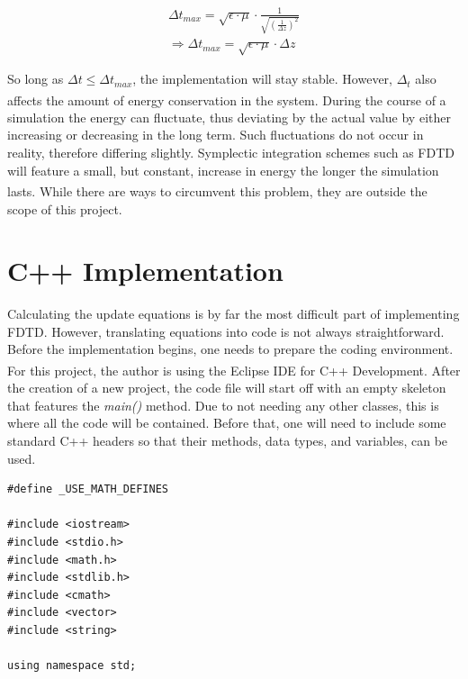 \begin{align}
	\label{eqn:1DdeltaTMaxFinal}
	\Delta t_{max} = \sqrt{\epsilon \cdot \mu} \cdot \frac{1}{\sqrt{(\frac{1}{\Delta z})^2}} \\
	\Rightarrow \Delta t_{max} = \sqrt{\epsilon \cdot \mu} \cdot \Delta z
\end{align}

So long as $\Delta t \leq \Delta t_{max}$, the implementation will stay stable. However, $\Delta_t$ also affects the amount of energy conservation in the system\textsuperscript{\cite{engle_skeel_drees_2005}}. During the course of a simulation the energy can fluctuate, thus deviating by the actual value by either increasing or decreasing in the long term. Such fluctuations do not occur in reality, therefore differing slightly. Symplectic integration schemes such as FDTD will feature a small, but constant, increase in energy the longer the simulation lasts. While there are ways to circumvent this problem\textsuperscript{\cite{gao2013optimal}}, they are outside the scope of this project.


\section{C++ Implementation}

Calculating the update equations is by far the most difficult part of implementing FDTD. However, translating equations into code is not always straightforward. Before the implementation begins, one needs to prepare the coding environment. For this project, the author is using the Eclipse IDE for C++ Development\textsuperscript{\cite{eclipse}}. After the creation of a new project, the code file will start off with an empty skeleton that features the \textit{main()} method. Due to not needing any other classes, this is where all the code will be contained. Before that, one will need to include some standard C++ headers so that their methods, data types, and variables, can be used.

\begin{verbatim}
#define _USE_MATH_DEFINES
	
#include <iostream>
#include <stdio.h>
#include <math.h>
#include <stdlib.h>
#include <cmath>
#include <vector>
#include <string>

using namespace std;
\end{verbatim}

